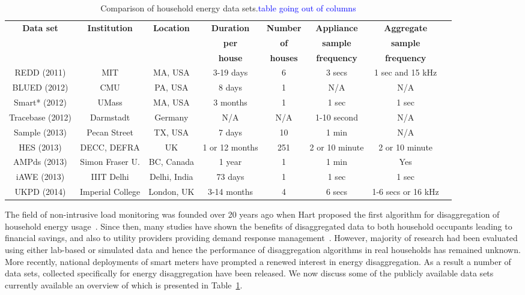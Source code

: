 \documentclass{sig-alternate}
\newcommand{\bluecolor}[1]{\textcolor{blue}{#1}}
\newcommand{\tabref}[1]{Table~\ref{#1}}
\begin{document}
\begin{table}[]
  \centering
  \begin{tabular}{c c c c c c c c}
    \hline
    \bf Data set & \bf Institution & \bf Location & \bf Duration & \bf Number & \bf Appliance & \bf Aggregate\\
    \bf  & \bf  & \bf  & \bf per  & \bf of & \bf sample & \bf sample\\
    \bf  & \bf  & \bf  & \bf house & \bf houses & \bf frequency & \bf frequency\\
    \hline
    REDD (2011) & MIT & MA, USA & 3-19 days & 6 & 3 secs & 1 sec and 15 kHz\\
    BLUED (2012) & CMU & PA, USA & 8 days & 1 & N/A & N/A\\
    Smart* (2012) & UMass & MA, USA & 3 months & 1 & 1 sec & 1 sec\\
    Tracebase (2012) & Darmstadt & Germany & N/A & N/A & 1-10 second & N/A\\
    Sample (2013) & Pecan Street & TX, USA & 7 days & 10 & 1 min & N/A\\
    HES (2013) & DECC, DEFRA & UK & 1 or 12 months & 251 & 2 or 10 minute
    & 2 or 10 minute\\
    AMPds (2013) & Simon Fraser U. & BC, Canada & 1 year & 1 & 1 min & Yes\\
    iAWE (2013) & IIIT Delhi & Delhi, India & 73 days & 1 & 1 sec & 1 sec\\
    UKPD (2014) & Imperial College & London, UK & 3-14 months & 4 & 6 secs & 1-6 secs or 16 kHz \\
    \hline
  \end{tabular}
  \caption{Comparison of household energy data sets.\bluecolor{table going out of columns}}
  \label{table:datasets}
\end{table}

\noindent
The field of non-intrusive load monitoring was founded over 20 years ago when Hart proposed the first algorithm for disaggregation of household energy usage~\cite{hart_1992}. Since then, many studies have shown the benefits of disaggregated data to both household occupants leading to financial savings, and also to utility providers providing demand response management~\cite{zeifman_2011,armel_2013}. However, majority of research had been evaluated using either lab-based or simulated data and hence the performance of disaggregation algorithms in real households has remained unknown. More recently, national deployments of smart meters have prompted a renewed interest in energy disaggregation. As a result a number of data sets, collected specifically for energy disaggregation have been released. We now discuss some of the publicly available data sets currently available an overview of which is presented in \tabref{table:datasets}.
\end{document}
